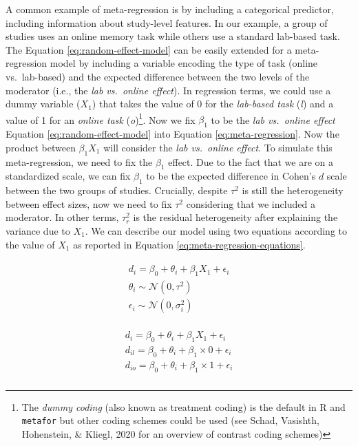 \documentclass[
  man,floatsintext]{apa6}
\begin{document}
A common example of meta-regression is by including a categorical predictor, including information about study-level features. In our example, a group of studies uses an online memory task while others use a standard lab-based task. The Equation \eqref{eq:random-effect-model} can be easily extended for a meta-regression model by including a variable encoding the type of task (online vs.~lab-based) and the expected difference between the two levels of the moderator (i.e., the \emph{lab vs.~online effect}). In regression terms, we could use a dummy variable (\(X_{1}\)) that takes the value of 0 for the \emph{lab-based task} (\emph{l}) and a value of 1 for an \emph{online task} (\emph{o})\footnote{The \emph{dummy coding} (also known as treatment coding) is the default in R and \texttt{metafor} but other coding schemes could be used (see Schad, Vasishth, Hohenstein, \& Kliegl, 2020 for an overview of contrast coding schemes)}. Now we fix \(\beta_{1}\) to be the \emph{lab vs.~online effect} Equation \eqref{eq:random-effect-model} into Equation \eqref{eq:meta-regression}. Now the product between \(\beta_{1}X_{1}\) will consider the \emph{lab vs.~online effect}. To simulate this meta-regression, we need to fix the \(\beta_{1}\) effect. Due to the fact that we are on a standardized scale, we can fix \(\beta_{1}\) to be the expected difference in Cohen's \(d\) scale between the two groups of studies. Crucially, despite \(\tau^{2}\) is still the heterogeneity between effect sizes, now we need to fix \(\tau^{2}\) considering that we included a moderator. In other terms, \(\tau_{r}^{2}\) is the residual heterogeneity after explaining the
variance due to \(X_{1}\). We can describe our model using two equations according to the value of \(X_{1}\) as reported in Equation \eqref{eq:meta-regression-equations}.

\begin{align}
\begin{gathered}
d_i = \beta_0 + \theta_i + \beta_1 X_1 + \epsilon_i \\
\theta_i \sim \mathcal{N}(0, \tau^2) \\
\epsilon_i \sim \mathcal{N}(0,\sigma^2_i)
\label{eq:meta-regression}
\end{gathered}
\end{align}

\begin{align}
\begin{gathered}
d_i = \beta_0 + \theta_i + \beta_1 X_1 + \epsilon_i \\
d_{il} = \beta_0 + \theta_i + \beta_1 \times 0 + \epsilon_i \\
d_{io} = \beta_0 + \theta_i + \beta_1 \times 1 + \epsilon_i \\
\label{eq:meta-regression-equations}
\end{gathered}
\end{align}
\end{document}

